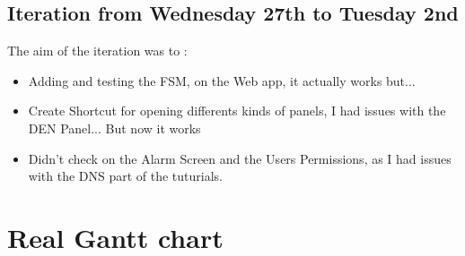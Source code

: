 \documentclass[a4paper, 10pt]{article}
\begin{document}
\subsection{Iteration from Wednesday 27th to Tuesday 2nd}
The aim of the iteration was to :
\begin{itemize}
    \item Adding and testing the FSM, on the Web app, it actually works but...
    \item Create Shortcut for opening differents kinds of panels, I had issues with the DEN Panel... But now it works
    \item Didn't check on the Alarm Screen and the Users Permissions, as I had issues with the DNS part of the tuturials.
\end{itemize}


\section{Real Gantt chart}
\end{document}

